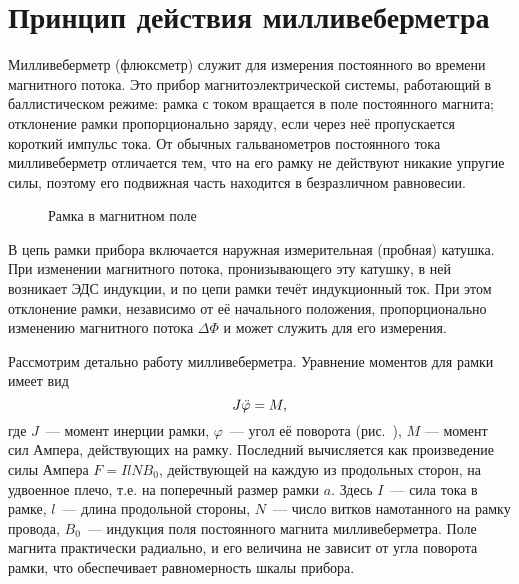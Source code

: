 \newpage

\labsupplement

\section*{Принцип действия милливеберметра}\label{MWB}

\setcounter{figure}{0}
\small 

Милливеберметр (флюксметр) служит для измерения постоянного во времени
магнитного потока. Это прибор магнитоэлектрической системы, 
работающий в баллистическом режиме: рамка с током вращается в поле 
постоянного магнита; отклонение рамки пропорционально заряду,
если через неё пропускается короткий импульс тока. 
От обычных гальванометров постоянного тока милливеберметр 
отличается тем, что на его рамку не действуют никакие упругие силы, 
поэтому его подвижная часть находится в безразличном равновесии.

\begin{figure}[h!]
    \caption{Рамка в магнитном поле}
\end{figure}

В цепь рамки прибора включается наружная измерительная (пробная) катушка. 
При изменении магнитного потока, пронизывающего эту катушку, 
в ней возникает ЭДС индукции, и по цепи рамки течёт индукционный ток. 
При этом отклонение рамки, независимо от её начального
положения, пропорционально изменению магнитного потока $\Delta\Phi$ 
и может служить для его измерения.

Рассмотрим детально работу милливеберметра. 
Уравнение моментов для рамки имеет вид
\begin{equation}
    J\ddot{\varphi}=M,
    \eqmark{MWB.1}
\end{equation}
где $J$~--- момент инерции рамки, 
$\varphi$~--- угол её поворота (рис.~),
$M$ --- момент сил Ампера, действующих на рамку.
Последний вычисляется как произведение силы Ампера $F=IlNB_0$, 
действующей на каждую из продольных сторон,
на удвоенное плечо, т.е. на поперечный размер
рамки $a$. Здесь $I$~--- сила тока в рамке, $l$~--- длина продольной
стороны, $N$~--- число витков намотанного на рамку провода, 
$B_0$~--- индукция поля постоянного магнита милливеберметра. 
Поле магнита практически радиально, и его величина не зависит от угла поворота
рамки, что обеспечивает равномерность шкалы прибора. 

